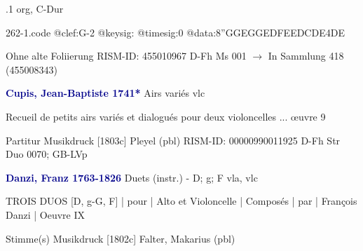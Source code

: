 \documentclass[twocolumn]{book}
\begin{document}
.1  org, C-Dur  
\begin{filecontents*}{262-1.code}
@clef:G-2
@keysig:
@timesig:0
@data:{8''GGEG}{GEDF}{EEDC}{DE}4DE
\end{filecontents*}
\newline
%
\newline Ohne alte Foliierung
\newline RISM-ID: 455010967
\newline D-Fh  Ms 001
\newline $\rightarrow$ In Sammlung 418 (455008343)
      
\newline \par \vspace{7pt} \textcolor{darkblue}{\textbf{Cupis, Jean-Baptiste  1741*}}
\newline Airs variés
 vlc
\newline \begin{itshape}Recueil de petits airs variés et dialogués pour deux violoncelles ... œuvre 9\end{itshape} 
\newline \textcolor{darkblue}{}  Partitur
\newline Musikdruck  [1803c]
\newline Pleyel  (pbl)
\newline RISM-ID: 00000990011925
\newline D-Fh  Str Duo 0070; GB-LVp
\newline \par \vspace{7pt} \textcolor{darkblue}{\textbf{Danzi, Franz  1763-1826}}
\newline Duets (instr.) - D; g; F
\newline vla, vlc
\newline \begin{itshape}TROIS DUOS [D, g-G, F] | pour | Alto et Violoncelle | Composés | par | François Danzi |  Oeuvre IX\end{itshape} 
\newline \textcolor{darkblue}{}  Stimme(s)
\newline Musikdruck  [1802c]
\newline Falter, Makarius  (pbl)
\end{document}
